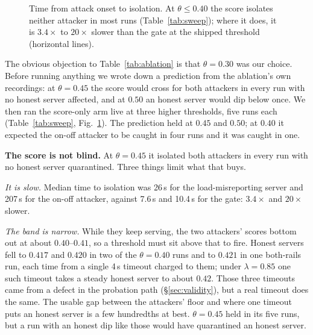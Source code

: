 \documentclass[10pt,twocolumn,letterpaper]{article}
\begin{document}
\begin{figure}[t]
\centering
{}
\caption{Time from attack onset to isolation. At $\theta \le 0.40$ the score
isolates neither attacker in most runs (Table~\ref{tab:sweep}); where it does, it
is $3.4\times$ to $20\times$ slower than the gate at the shipped threshold
(horizontal lines).}
\label{fig:sweep}
\end{figure}

The obvious objection to Table~\ref{tab:ablation} is that $\theta = 0.30$ was our
choice. Before running anything we wrote down a prediction from the ablation's
own recordings: at $\theta = 0.45$ the score would cross for both attackers in
every run with no honest server affected, and at $0.50$ an honest server would
dip below once. We then ran the score-only arm live at three higher thresholds,
five runs each (Table~\ref{tab:sweep}, Fig.~\ref{fig:sweep}). The prediction held
at $0.45$ and $0.50$; at $0.40$ it expected the on-off attacker to be caught in
four runs and it was caught in one.

\textbf{The score is not blind.} At $\theta = 0.45$ it isolated both attackers
in every run with no honest server quarantined. Three things limit what that
buys.

\emph{It is slow.} Median time to isolation was 26\,s for the load-misreporting
server and 207\,s for the on-off attacker, against 7.6\,s and 10.4\,s for the
gate: $3.4\times$ and $20\times$ slower.

\emph{The band is narrow.} While they keep serving, the two attackers' scores
bottom out at about $0.40$--$0.41$, so a threshold must sit above that to fire.
Honest servers fell to $0.417$ and $0.420$ in two of the $\theta = 0.40$ runs
and to $0.421$ in one both-rails run, each time from a single 4\,s timeout
charged to them; under $\lambda = 0.85$ one such timeout takes a steady honest
server to about $0.42$. Those three timeouts came from a defect in the
probation path (\S\ref{sec:validity}), but a real timeout does the same. The
usable gap between the attackers' floor and where one timeout puts an honest
server is a few hundredths at best. $\theta = 0.45$ held in its five runs, but
a run with an honest dip like those would have quarantined an honest server.
\end{document}

